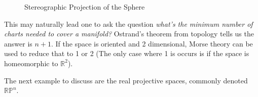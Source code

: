         \begin{figure}[H]
            \centering
            \captionsetup{type=figure}
            
            \caption{Stereographic Projection of the Sphere}
            \label{fig:Sphere_Stereographic_Proj}
        \end{figure}
        This may naturally lead one to ask the question
        \textit{what's the minimum number of charts needed to cover a manifold?}
        Ostrand's theorem from topology tells us the answer is $n+1$. If the
        space is oriented and 2 dimensional, Morse theory can be used to reduce
        that to 1 or 2 (The only case where 1 is occurs is if the space is
        homeomorphic to $\mathbb{R}^{2}$).
        \par\hfill\par
        The next example to discuss are the real projective spaces, commonly
        denoted $\mathbb{RP}^{n}$.
